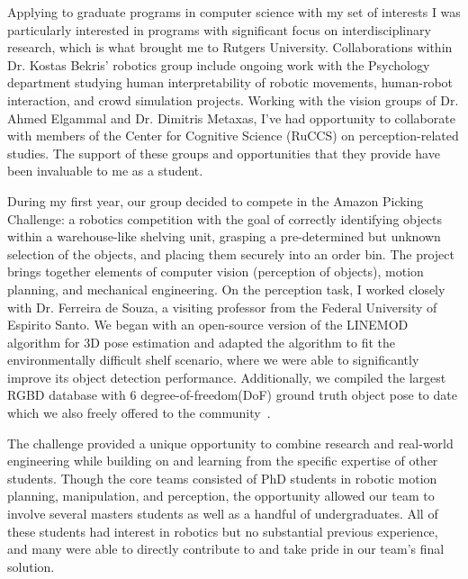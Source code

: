 
Applying to graduate programs in computer science with my set of interests I was particularly interested in programs with significant focus on interdisciplinary research, which is what brought me to Rutgers University. Collaborations within Dr. Kostas Bekris' robotics group include ongoing work with the Psychology department studying human interpretability of robotic movements, human-robot interaction, and crowd simulation projects. Working with the vision groups of Dr. Ahmed Elgammal and Dr. Dimitris Metaxas, I've had opportunity to collaborate with members of the Center for Cognitive Science (RuCCS) on perception-related studies. The support of these groups and opportunities that they provide have been invaluable to me as a student.

During my first year, our group decided to compete in the Amazon Picking Challenge: a robotics competition with the goal of correctly identifying objects within a warehouse-like shelving unit, grasping a pre-determined but unknown selection of the objects, and placing them securely into an order bin. The project brings together elements of computer vision (perception of objects), motion planning, and mechanical engineering. On the perception task, I worked closely with Dr. Ferreira de Souza, a visiting professor from the Federal University of Espirito Santo. We began with an open-source version of the LINEMOD algorithm for 3D pose estimation and adapted the algorithm to fit the environmentally difficult shelf scenario, where we were able to significantly improve its object detection performance. Additionally, we compiled the largest RGBD database with 6 degree-of-freedom(DoF) ground truth object pose to date which we also freely offered to the community~\cite{rennie2015dataset}.

The challenge provided a unique opportunity to combine research and real-world engineering while building on and learning from the specific expertise of other students. Though the core teams consisted of PhD students in robotic motion planning, manipulation, and perception, the opportunity allowed our team to involve several masters students as well as a handful of undergraduates. All of these students had interest in robotics but no substantial previous experience, and many were able to directly contribute to and take pride in our team's final solution.


